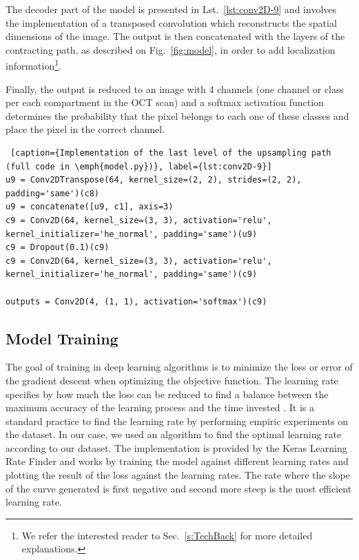 \documentclass[12pt,a4paper]{scrartcl}
\begin{document}
The decoder part of the model is presented in Lst.~\ref{lst:conv2D-9} and involves the implementation of a transposed convolution which reconstructs the spatial dimensions of the image. The output is then concatenated with the layers of the contracting path, as described on Fig.~\ref{fig:model}, in order to add localization information\footnote{We refer the interested reader to Sec.~\ref{s:TechBack} for more detailed explanations.}.


Finally, the output is reduced to an image with 4 channels (one channel or class per each compartment in the OCT scan) and a softmax activation function determines the probability that the pixel belongs to each one of these classes and place the pixel in the correct channel.

\begin{lstlisting} [caption={Implementation of the last level of the upsampling path (full code in \emph{model.py})}, label={lst:conv2D-9}]
u9 = Conv2DTranspose(64, kernel_size=(2, 2), strides=(2, 2), padding='same')(c8)
u9 = concatenate([u9, c1], axis=3)
c9 = Conv2D(64, kernel_size=(3, 3), activation='relu', kernel_initializer='he_normal', padding='same')(u9)
c9 = Dropout(0.1)(c9)
c9 = Conv2D(64, kernel_size=(3, 3), activation='relu', kernel_initializer='he_normal', padding='same')(c9)
 
outputs = Conv2D(4, (1, 1), activation='softmax')(c9)
\end{lstlisting}
\subsection{Model Training}\label{ss:model_training}

The goal of training in deep learning algorithms is to minimize the loss or error of the gradient descent when optimizing the objective function. The learning rate specifies by how much the loss can be reduced to find a balance between the maximum accuracy of the learning process and the time invested \cite{Zhang2021}. It is a standard practice to find the learning rate by performing empiric experiments on the dataset. In our case, we used an algorithm to find the optimal learning rate according to our dataset. The implementation is provided by the Keras Learning Rate Finder \cite{chollet2015keras} and works by training the model against different learning rates and plotting the result of the loss against the learning rates. The rate where the slope of the curve generated is first negative and second more steep is the most efficient learning rate. 
\end{document}
